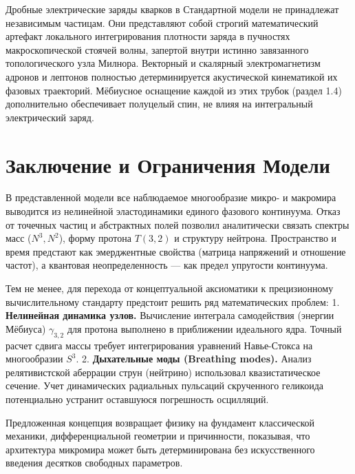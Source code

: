 \documentclass[11pt,a4paper]{article}
\begin{document}
	Дробные электрические заряды кварков в Стандартной модели не принадлежат независимым частицам. Они представляют собой строгий математический артефакт локального интегрирования плотности заряда в пучностях макроскопической стоячей волны, запертой внутри истинно завязанного топологического узла Милнора. Векторный и скалярный электромагнетизм адронов и лептонов полностью детерминируется акустической кинематикой их фазовых траекторий. Мёбиусное оснащение каждой из этих трубок (раздел 1.4) дополнительно обеспечивает полуцелый спин, не влияя на интегральный электрический заряд.
	
	\section*{Заключение и Ограничения Модели}
	
	В представленной модели все наблюдаемое многообразие микро- и макромира выводится из нелинейной эластодинамики единого фазового континуума. Отказ от точечных частиц и абстрактных полей позволил аналитически связать спектры масс ($N^3, N^2$), форму протона $T(3,2)$ и структуру нейтрона. Пространство и время предстают как эмерджентные свойства (матрица напряжений и отношение частот), а квантовая неопределенность — как предел упругости континуума.
	
	Тем не менее, для перехода от концептуальной аксиоматики к прецизионному вычислительному стандарту предстоит решить ряд математических проблем:
	1. \textbf{Нелинейная динамика узлов.} Вычисление интеграла самодействия (энергии Мёбиуса) $\gamma_{3,2}$ для протона выполнено в приближении идеального ядра. Точный расчет сдвига массы требует интегрирования уравнений Навье-Стокса на многообразии $S^3$.
	2. \textbf{Дыхательные моды (Breathing modes).} Анализ релятивистской аберрации струн (нейтрино) использовал квазистатическое сечение. Учет динамических радиальных пульсаций скрученного геликоида потенциально устранит оставшуюся погрешность осцилляций.
	
	Предложенная концепция возвращает физику на фундамент классической механики, дифференциальной геометрии и причинности, показывая, что архитектура микромира может быть детерминирована без искусственного введения десятков свободных параметров.
	
\end{document}
